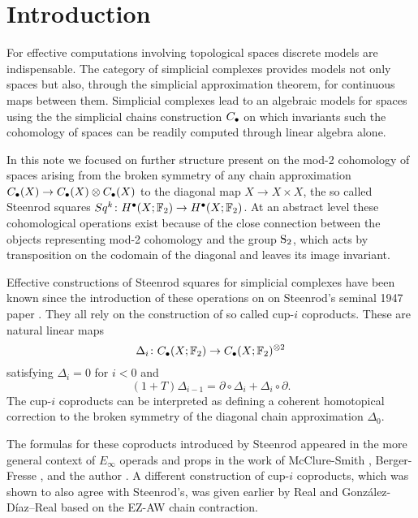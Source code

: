 
\section{Introduction}

For effective computations involving topological spaces discrete models are indispensable.
The category of simplicial complexes provides models not only spaces but also, through the simplicial approximation theorem, for continuous maps between them.
Simplicial complexes lead to an algebraic models for spaces using the the simplicial chains construction $\chains$ on which invariants such the cohomology of spaces can be readily computed through linear algebra alone.

In this note we focused on further structure present on the mod-2 cohomology of spaces arising from the broken symmetry of any chain approximation $\chains(X) \to \chains(X) \otimes \chains(X)$ to the diagonal map $X \to X \times X$, the so called Steenrod squares $Sq^k \colon H^\bullet(X; \F_2) \to H^\bullet(X; \F_2)$.
At an abstract level these cohomological operations exist because of the close connection between the objects representing mod-2 cohomology and the group $\S_2$, which acts by transposition on the codomain of the diagonal and leaves its image invariant.

Effective constructions of Steenrod squares for simplicial complexes have been known since the introduction of these operations on on Steenrod's seminal 1947 paper \cite{steenrod47}.
They all rely on the construction of so called cup-$i$ coproducts.
These are natural linear maps
\begin{equation*}
\Delta_i \colon \chains(X; \F_2)  \to \chains(X; \F_2)^{\otimes 2}
\end{equation*}
satisfying $\Delta_i = 0$ for $i < 0$ and
\begin{equation*}
(1 + T) \Delta_{i-1} = \partial \circ \Delta_i + \Delta_i \circ \partial.
\end{equation*}
The cup-$i$ coproducts can be interpreted as defining a coherent homotopical correction to the broken symmetry of the diagonal chain approximation $\Delta_0$.

The formulas for these coproducts introduced by Steenrod appeared in the more general context of $E_\infty$ operads and props in the work of McClure-Smith \cite{mcclure03cochain}, Berger-Fresse \cite{berger04combinatorial}, and the author \cite{medina2020prop1, medina2018prop2}.
A different construction of cup-$i$ coproducts, which was shown to also agree with Steenrod's, was given earlier by Real \cite{bibid} and Gonz\'alez-D\'iaz--Real \cite{bibid} based on the EZ-AW chain contraction.

